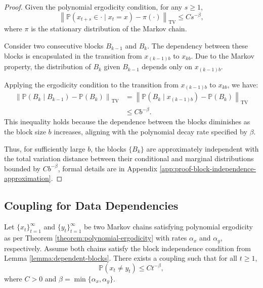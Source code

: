 \begin{proof}
Given the polynomial ergodicity condition, for any \(s \geq 1\),
\[
\left\| \mathbb{P}(x_{t+s} \in \cdot \mid x_t = x) - \pi(\cdot) \right\|_{\text{TV}} \leq C s^{-\beta},
\]
where \(\pi\) is the stationary distribution of the Markov chain.

Consider two consecutive blocks \(B_{k-1}\) and \(B_k\). The dependency between these blocks is encapsulated in the transition from \(x_{(k-1)b}\) to \(x_{kb}\). Due to the Markov property, the distribution of \(B_k\) given \(B_{k-1}\) depends only on \(x_{(k-1)b}\).

Applying the ergodicity condition to the transition from \(x_{(k-1)b}\) to \(x_{kb}\), we have:
\begin{align*}
\left\| \mathbb{P}(B_k \mid B_{k-1}) - \mathbb{P}(B_k) \right\|_{\text{TV}} &= \left\| \mathbb{P}(B_k \mid x_{(k-1)b}) - \mathbb{P}(B_k) \right\|_{\text{TV}}\\
&\leq C b^{-\beta}.
\end{align*}
This inequality holds because the dependence between the blocks diminishes as the block size \(b\) increases, aligning with the polynomial decay rate specified by \(\beta\).

Thus, for sufficiently large \(b\), the blocks \(\{B_k\}\) are approximately independent with the total variation distance between their conditional and marginal distributions bounded by \(C b^{-\beta}\), formal details are in Appendix \ref{app:proof-block-independence-approximation}.
\end{proof}

\subsection{Coupling for Data Dependencies}

\begin{lemma}
\label{lemma:coupling-argument-polynomial-mixing}
Let \(\{x_t\}_{t=1}^\infty\) and \(\{y_t\}_{t=1}^\infty\) be two Markov chains satisfying polynomial ergodicity as per Theorem \ref{theorem:polynomial-ergodicity} with rates \(\alpha_x\) and \(\alpha_y\), respectively. Assume both chains satisfy the block independence condition from Lemma \ref{lemma:dependent-blocks}. There exists a coupling such that for all \(t \geq 1\),
\[
\mathbb{P}(x_t \neq y_t) \leq C t^{-\beta},
\]
where \(C > 0\) and \(\beta = \min\{\alpha_x, \alpha_y\}\).
\end{lemma}

